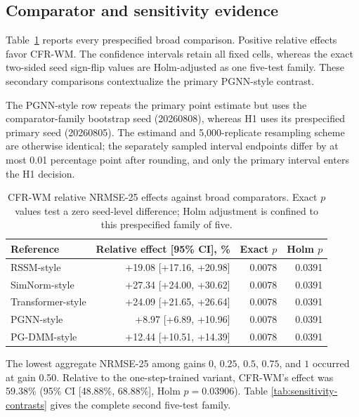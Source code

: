 \documentclass[iicol,pdflatex,sn-basic,Numbered]{sn-jnl}
\newcommand{\BestGain}{0.50}
\newcommand{\OneStepImprovement}{59.38}
\newcommand{\OneStepRelativeCILow}{48.88}
\newcommand{\OneStepRelativeCIHigh}{68.88}
\newcommand{\OneStepHolmP}{0.03906}
\begin{document}
\subsection{Comparator and sensitivity evidence}

Table~\ref{tab:comparator-contrasts} reports every prespecified broad
comparison. Positive relative effects favor CFR-WM. The confidence intervals
retain all fixed cells, whereas the exact two-sided seed sign-flip values are
Holm-adjusted as one five-test family. These secondary comparisons contextualize
the primary PGNN-style contrast.

The PGNN-style row repeats the primary point estimate but uses the
comparator-family bootstrap seed (20260808), whereas H1 uses its prespecified
primary seed (20260805). The estimand and 5,000-replicate resampling scheme are
otherwise identical; the separately sampled interval endpoints differ by at
most 0.01 percentage point after rounding, and only the primary interval enters
the H1 decision.

\begin{table}[t]
\centering
\caption{CFR-WM relative NRMSE-25 effects against broad comparators. Exact
$p$ values test a zero seed-level difference; Holm adjustment is confined to
this prespecified family of five.}
\label{tab:comparator-contrasts}
\begin{tabular}{lrrr}
\toprule
Reference & Relative effect [95\% CI], \% & Exact $p$ & Holm $p$ \\
\midrule
RSSM-style & +19.08 [+17.16, +20.98] & 0.0078 & 0.0391 \\
SimNorm-style & +27.34 [+24.00, +30.62] & 0.0078 & 0.0391 \\
Transformer-style & +24.09 [+21.65, +26.64] & 0.0078 & 0.0391 \\
PGNN-style & +8.97 [+6.89, +10.96] & 0.0078 & 0.0391 \\
PG-DMM-style & +12.44 [+10.51, +14.39] & 0.0078 & 0.0391 \\
\bottomrule
\end{tabular}
\end{table}

The lowest aggregate NRMSE-25 among gains $0$, $0.25$, $0.5$, $0.75$, and $1$
occurred at gain \BestGain. Relative to the one-step-trained variant, CFR-WM's
effect was \OneStepImprovement\% (95\% CI [\OneStepRelativeCILow\%,
\OneStepRelativeCIHigh\%], Holm $p=\OneStepHolmP$). Table
\ref{tab:sensitivity-contrasts} gives the complete second five-test family.
\end{document}
